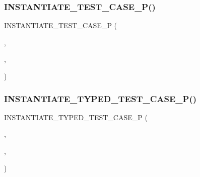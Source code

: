 \subsubsection{\texorpdfstring{INSTANTIATE\_TEST\_CASE\_P()}{INSTANTIATE\_TEST\_CASE\_P()}}
{\footnotesize\ttfamily I\+N\+S\+T\+A\+N\+T\+I\+A\+T\+E\+\_\+\+T\+E\+S\+T\+\_\+\+C\+A\+S\+E\+\_\+P (\begin{DoxyParamCaption}\item[{My\+Instantiation}]{,  }\item[{\mbox{\hyperlink{classValueParamTest}{Value\+Param\+Test}}}]{,  }\item[{\mbox{\hyperlink{namespacetesting_a8209ef59db08b8ad4beed30d8d6e6a88}{testing\+::\+Values}}(\mbox{\hyperlink{classMyType}{My\+Type}}(\char`\"{}one line\char`\"{}), My\+Type(\char`\"{}two\textbackslash{}nlines\char`\"{}), My\+Type(\char`\"{}a very\textbackslash{}nloooooooooooooooooooooooooooooooooooooooooooooooooooooooooooooooooooooooooooooooooooooooooooooooooooooooooooooooooooooooooooooooooooooooooooooooooooooooooooooooooooooooooooooooooooooooooooooooooooooooooooooooooooooooooooooooooooooooooooooooooooooooooong line\char`\"{}))}]{ }\end{DoxyParamCaption})}

\mbox{\label{googletest-list-tests-unittest___8cc_abace4e22d147fb69e2be527b355a2316}} 
\subsubsection{\texorpdfstring{INSTANTIATE\_TYPED\_TEST\_CASE\_P()}{INSTANTIATE\_TYPED\_TEST\_CASE\_P()}}
{\footnotesize\ttfamily I\+N\+S\+T\+A\+N\+T\+I\+A\+T\+E\+\_\+\+T\+Y\+P\+E\+D\+\_\+\+T\+E\+S\+T\+\_\+\+C\+A\+S\+E\+\_\+P (\begin{DoxyParamCaption}\item[{My}]{,  }\item[{\mbox{\hyperlink{classTypeParamTest}{Type\+Param\+Test}}}]{,  }\item[{\mbox{\hyperlink{googletest-list-tests-unittest___8cc_a16f58cd49c18568802322bbaf9f3f654}{My\+Types}}}]{ }\end{DoxyParamCaption})}

